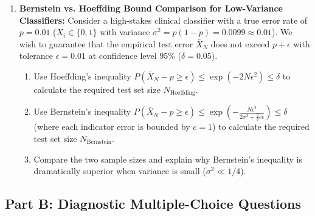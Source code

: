 \begin{enumerate}[label=\textbf{P\arabic*.}]
    \item \textbf{Bernstein vs. Hoeffding Bound Comparison for Low-Variance Classifiers:}
    Consider a high-stakes clinical classifier with a true error rate of $p = 0.01$ ($X_i \in \{0, 1\}$ with variance $\sigma^2 = p(1-p) = 0.0099 \approx 0.01$). We wish to guarantee that the empirical test error $\bar{X}_N$ does not exceed $p + \epsilon$ with tolerance $\epsilon = 0.01$ at confidence level $95\%$ ($\delta = 0.05$).
    \begin{enumerate}[label=(\alph*)]
        \item Use Hoeffding's inequality $P(\bar{X}_N - p \ge \epsilon) \le \exp(-2N\epsilon^2) \le \delta$ to calculate the required test set size $N_{\text{Hoeffding}}$.
        \item Use Bernstein's inequality $P(\bar{X}_N - p \ge \epsilon) \le \exp\left(-\frac{N\epsilon^2}{2\sigma^2 + \frac{2}{3}c\epsilon}\right) \le \delta$ (where each indicator error is bounded by $c = 1$) to calculate the required test set size $N_{\text{Bernstein}}$.
        \item Compare the two sample sizes and explain why Bernstein's inequality is dramatically superior when variance is small ($\sigma^2 \ll 1/4$).
    \end{enumerate}
\end{enumerate}

\subsection*{Part B: Diagnostic Multiple-Choice Questions}

